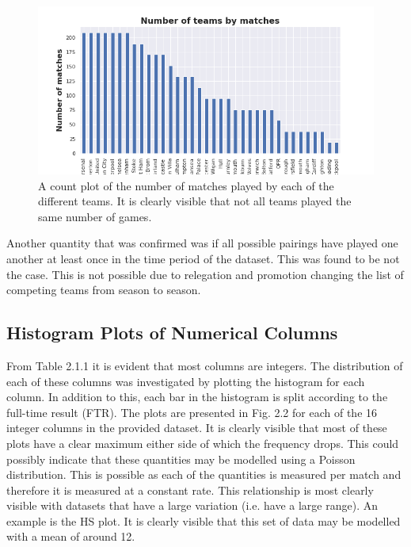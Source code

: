 \documentclass[a4paper,12pt]{article}
\begin{document}
		\begin{figure}[h]
			\renewcommand\thefigure{2.1}
			\centering
			
			\includegraphics[scale=0.6]{num_of_matches.png}
			\caption{A count plot of the number of matches played by each of the different teams. It is clearly visible that not all teams played the same number of games.}
		\end{figure}
		
		Another quantity that was confirmed was if all possible pairings have played one another at least once in the time period of the dataset. This was found to be not the case. This is not possible due to relegation and promotion changing the list of competing teams from season to season.  
	
	\subsection{Histogram Plots of Numerical Columns}
		
		From Table 2.1.1 it is evident that most columns are integers. The distribution of each of these columns was investigated by plotting the histogram for each column. In addition to this, each bar in the histogram is split according to the full-time result (FTR). The plots are presented in Fig. 2.2 for each of the 16 integer columns in the provided dataset. It is clearly visible that most of these plots have a clear maximum either side of which the frequency drops. This could possibly indicate that these quantities may be modelled using a Poisson distribution. This is possible as each of the quantities is measured per match and therefore it is measured at a constant rate. This relationship is most clearly visible with datasets that have a large variation (i.e. have a large range). An example is the HS plot. It is clearly visible that this set of data may be modelled with a mean of around 12.
		
\end{document}
